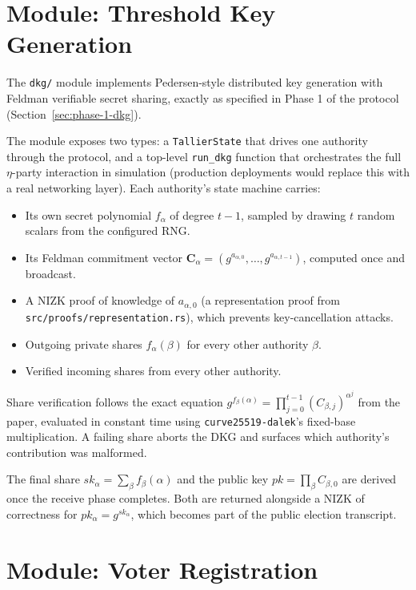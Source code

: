 \documentclass[12pt,a4paper,oneside]{report}
\begin{document}
\section{Module: Threshold Key Generation}
\label{sec:impl-dkg}

The \texttt{dkg/} module implements Pedersen-style distributed key 
generation with Feldman verifiable secret sharing, exactly as specified 
in Phase 1 of the protocol (Section~\ref{sec:phase-1-dkg}).

The module exposes two types: a \texttt{TallierState} that drives one 
authority through the protocol, and a top-level \texttt{run\_dkg} 
function that orchestrates the full $\eta$-party interaction in 
simulation (production deployments would replace this with a real 
networking layer). Each authority's state machine carries:

\begin{itemize}
    \item Its own secret polynomial $f_\alpha$ of degree $t - 1$, sampled 
    by drawing $t$ random scalars from the configured RNG.
    \item Its Feldman commitment vector 
    $\mathbf{C}_\alpha = (g^{a_{\alpha, 0}}, \ldots, g^{a_{\alpha, t-1}})$, 
    computed once and broadcast.
    \item A NIZK proof of knowledge of $a_{\alpha, 0}$ (a representation 
    proof from \texttt{src/proofs/representation.rs}), which prevents 
    key-cancellation attacks.
    \item Outgoing private shares $f_\alpha(\beta)$ for every other 
    authority $\beta$.
    \item Verified incoming shares from every other authority.
\end{itemize}

Share verification follows the exact equation 
$g^{f_\beta(\alpha)} = \prod_{j=0}^{t-1} (C_{\beta, j})^{\alpha^j}$ from 
the paper, evaluated in constant time using \texttt{curve25519-dalek}'s 
fixed-base multiplication. A failing share aborts the DKG and surfaces 
which authority's contribution was malformed.

The final share $sk_\alpha = \sum_\beta f_\beta(\alpha)$ and the public 
key $pk = \prod_\beta C_{\beta, 0}$ are derived once the receive phase 
completes. Both are returned alongside a NIZK of correctness for 
$pk_\alpha = g^{sk_\alpha}$, which becomes part of the public election 
transcript.

\section{Module: Voter Registration}
\label{sec:impl-registration}
\end{document}
